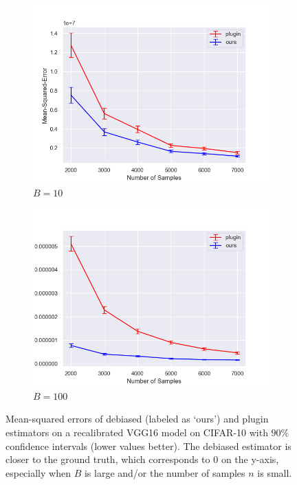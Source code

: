 \begin{figure}
  \centering
  \centering
     \begin{subfigure}[b]{0.48\textwidth}
         \centering
         \includegraphics[width=\textwidth]{images/mse_estimators_10_bins.png}
         \caption{$B = 10$
         }
         \label{fig:mse_estimators}
     \end{subfigure}
     \hfill
     \begin{subfigure}[b]{0.48\textwidth}
         \centering
         \includegraphics[width=\textwidth]{images/mse_estimator_100_bins.png}
         \caption{$B = 100$
         }
         \label{fig:mse_vs_ce_estimators}
     \end{subfigure}
  \caption{
    Mean-squared errors of debiased (labeled as `ours') and plugin estimators on a recalibrated VGG16 model on CIFAR-10 with $90\%$ confidence intervals (lower values better). The debiased estimator is closer to the ground truth, which corresponds to $0$ on the y-axis, especially when $B$ is large and/or the number of samples $n$ is small.
}
  \label{fig:mse_estimators_bins}
\end{figure}


